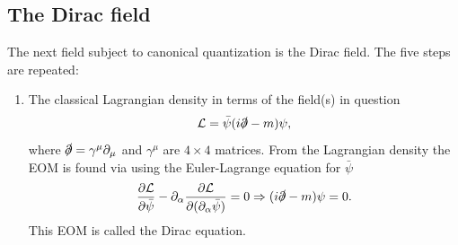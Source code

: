 \subsection*{The Dirac field}
The next field subject to canonical quantization is the Dirac field. The five steps are repeated:
\begin{enumerate}
	\item The classical Lagrangian density in terms of the field(s) in question
	\begin{equation}
		\mathcal{L}=\bar{\psi}(i\slashed \partial-m)\psi,
	\end{equation} 
	where $\slashed \partial =\gamma^\mu\partial_\mu$ and $\gamma^\mu$ are $4\times 4$ matrices. From the Lagrangian density the EOM is found via using the Euler-Lagrange equation for $\bar{\psi}$
	\begin{equation}
		\frac{\partial \mathcal{L}}{\partial \bar{\psi}}-\partial_\alpha\frac{\partial \mathcal{L}}{\partial (\partial_\alpha \bar{\psi})}=0 \Rightarrow (i\slashed \partial -m)\psi=0.
	\end{equation} 
	This EOM is called the Dirac equation. 
	

\end{enumerate}
